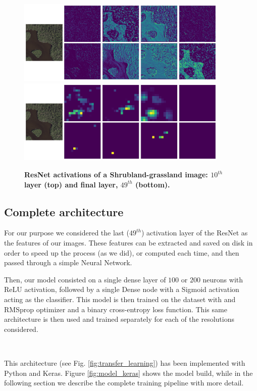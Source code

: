 \begin{figure}[h!]
	\centering
	\includegraphics[width=0.9\textwidth]{Figures/activations/shrubland-grassland_l0_s1_activation_10.png}
	\includegraphics[width=0.9\textwidth]{Figures/activations/shrubland-grassland_l0_s1_activation_49.png}
	\captionsetup{width=1\linewidth}
	\caption{\textbf{ResNet activations of a Shrubland-grassland image: $10^{th}$ layer (top) and final layer, $49^{th}$ (bottom).}}
	\label{fig:act_shrubland_grassland}
\end{figure}


\subsection{Complete architecture}

For our purpose we considered the last ($49^{th}$) activation layer of the ResNet as the features of our images. These features can be extracted and saved on disk in order to speed up the process (as we did), or computed each time, and then passed through a simple Neural Network.

Then, our model consisted on a single dense layer of $100$ or $200$ neurons with ReLU activation, followed by a single Dense node with a Sigmoid activation acting as the classifier. This model is then trained on the dataset with and RMSprop optimizer and a binary cross-entropy loss function. This same architecture is then used and trained separately for each of the resolutions considered.

\

This architecture (see Fig. \ref{fig:transfer_learning}) has been implemented with Python and Keras. Figure \ref{fig:model_keras} shows the model build, while in the following section we describe the complete training pipeline with more detail.

